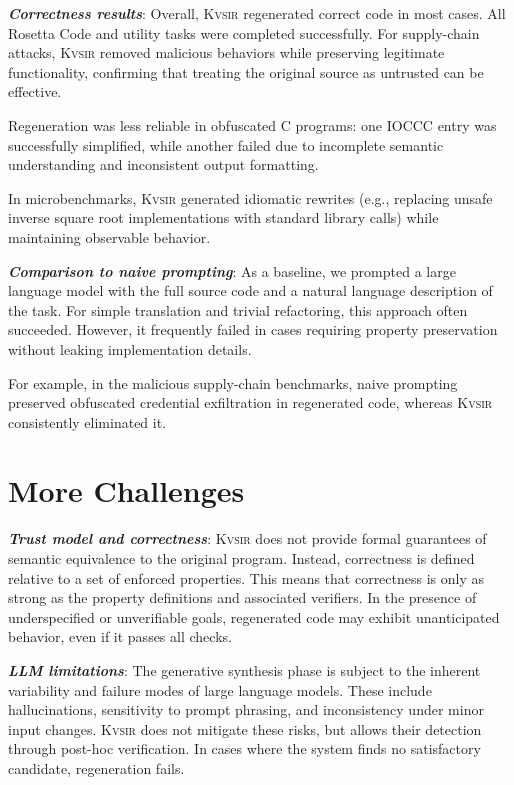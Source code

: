 \documentclass[sigplan,review,anonymous,10pt]{acmart}
\newcommand{\sys}{{\scshape Kv{\textalpha}sir}\xspace}
\newcommand{\heading}[1]{\vspace{2pt}\noindent\textbf{\emph{#1}}:\enspace}
\begin{document}
\heading{Correctness results}
Overall, \sys regenerated correct code in most cases. All Rosetta Code and
utility tasks were completed successfully. For supply-chain attacks, \sys
removed malicious behaviors while preserving legitimate functionality,
confirming that treating the original source as untrusted can be effective. 

Regeneration was less reliable in obfuscated C programs: one IOCCC entry was
successfully simplified, while another failed due to incomplete semantic
understanding and inconsistent output formatting.

In microbenchmarks, \sys generated idiomatic rewrites (e.g., replacing unsafe
inverse square root implementations with standard library calls) while
maintaining observable behavior.

\heading{Comparison to naive prompting}
As a baseline, we prompted a large language model with the full source code and
a natural language description of the task. For simple translation and trivial
refactoring, this approach often succeeded. However, it frequently failed in
cases requiring property preservation without leaking implementation details. 

For example, in the malicious supply-chain benchmarks, naive prompting
preserved obfuscated credential exfiltration in regenerated code, whereas \sys
consistently eliminated it.



\section{More Challenges}
\label{sec:limitations}

\heading{Trust model and correctness}
\sys
does not provide formal guarantees
of semantic equivalence
to the original program.
Instead,
correctness is defined relative to a set of enforced properties.
This means that correctness is only as strong as the property definitions and associated verifiers.
In the presence of underspecified or unverifiable goals,
regenerated code
may exhibit unanticipated behavior,
even if it passes all checks. 

\heading{LLM limitations}
The generative synthesis phase
is subject to the inherent variability and failure modes
of large language models.
These include hallucinations,
sensitivity to prompt phrasing,
and inconsistency
under minor input changes.
\sys does not mitigate these risks,
but allows their detection
through post-hoc verification.
In cases where the system finds no satisfactory candidate,
regeneration fails.
\end{document}
